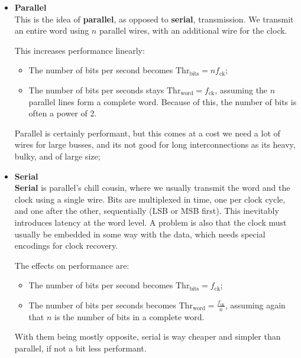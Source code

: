 \documentclass[a4paper,11pt]{article}
\begin{document}
\begin{itemize}
	\item \textbf{\textsf{Parallel}} \\
	      This is the idea of \textbf{parallel}, as opposed to \textbf{serial}, transmission.
	      We transmit an entire word using $n$ parallel wires, with an additional wire for the clock.

	      This increases performance linearly:
	      \begin{itemize}
		      \item The number of bits per second becomes $\text{Thr}_\text{bits} = n f_\text{ck}$;
		      \item The number of bits per seconds stays $\text{Thr}_\text{word} = f_\text{ck}$, assuming the $n$ parallel lines form a complete word. Because of this, the number of bits is often a power of 2.
	      \end{itemize}

	      Parallel is certainly performant, but this comes at a cost we need a lot of wires for large busses, and its not good for long interconnections as its heavy, bulky, and of large size;

	\item \textbf{\textsf{Serial}} \\
	      \textbf{Serial} is parallel's chill cousin, where we usually transmit the word and the clock using a single wire.
	      Bits are multiplexed in time, one per clock cycle, and one after the other, sequentially (LSB or MSB first).
	      This inevitably introduces latency at the word level.
	      A problem is also that the clock must usually be embedded in some way with the data, which needs special encodings for clock recovery.

	      The effects on performance are:
	      \begin{itemize}
		      \item The number of bits per second becomes $\text{Thr}_\text{bits} = f_\text{ck}$;
		      \item The number of bits per seconds becomes $\text{Thr}_\text{word} = \frac{ f_\text{ck}}{n}$, assuming again that $n$ is the number of bits in a complete word.
	      \end{itemize}

	      With them being mostly opposite, serial is way cheaper and simpler than parallel, if not a bit less performant.

\end{itemize}
\end{document}
